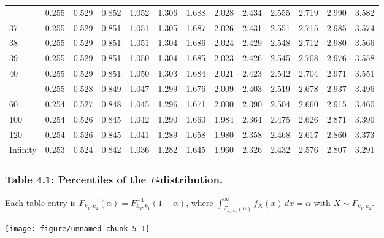 \documentclass[
]{article}
\begin{document}
\begin{longtable}[t]{lrrrrrrrrrrrr}
\addlinespace
36 & 0.255 & 0.529 & 0.852 & 1.052 & 1.306 & 1.688 & 2.028 & 2.434 & 2.555 & 2.719 & 2.990 & 3.582\\
37 & 0.255 & 0.529 & 0.851 & 1.051 & 1.305 & 1.687 & 2.026 & 2.431 & 2.551 & 2.715 & 2.985 & 3.574\\
38 & 0.255 & 0.529 & 0.851 & 1.051 & 1.304 & 1.686 & 2.024 & 2.429 & 2.548 & 2.712 & 2.980 & 3.566\\
39 & 0.255 & 0.529 & 0.851 & 1.050 & 1.304 & 1.685 & 2.023 & 2.426 & 2.545 & 2.708 & 2.976 & 3.558\\
40 & 0.255 & 0.529 & 0.851 & 1.050 & 1.303 & 1.684 & 2.021 & 2.423 & 2.542 & 2.704 & 2.971 & 3.551\\
\addlinespace
50 & 0.255 & 0.528 & 0.849 & 1.047 & 1.299 & 1.676 & 2.009 & 2.403 & 2.519 & 2.678 & 2.937 & 3.496\\
60 & 0.254 & 0.527 & 0.848 & 1.045 & 1.296 & 1.671 & 2.000 & 2.390 & 2.504 & 2.660 & 2.915 & 3.460\\
100 & 0.254 & 0.526 & 0.845 & 1.042 & 1.290 & 1.660 & 1.984 & 2.364 & 2.475 & 2.626 & 2.871 & 3.390\\
120 & 0.254 & 0.526 & 0.845 & 1.041 & 1.289 & 1.658 & 1.980 & 2.358 & 2.468 & 2.617 & 2.860 & 3.373\\
Infinity & 0.253 & 0.524 & 0.842 & 1.036 & 1.282 & 1.645 & 1.960 & 2.326 & 2.432 & 2.576 & 2.807 & 3.291\\
\bottomrule
\end{longtable}

\newpage

\subsubsection{\texorpdfstring{Table 4.1: Percentiles of the
\(F\)-distribution.}{Table 4.1: Percentiles of the F-distribution.}}\label{table-4.1-percentiles-of-the-f-distribution.}

Each table entry is
\(F_{k_1,k_2}(\alpha) = F_{k_2,k_1}^{-1}(1-\alpha)\), where
\(\int_{F_{k_1,k_2}(\alpha)}^{{\infty}}f_X(x) \, dx = \alpha\) with
\(X\sim F_{k_1,k_2}\).

\begin{center}\texttt{[image: figure/unnamed-chunk-5-1]} \end{center}
\end{document}
